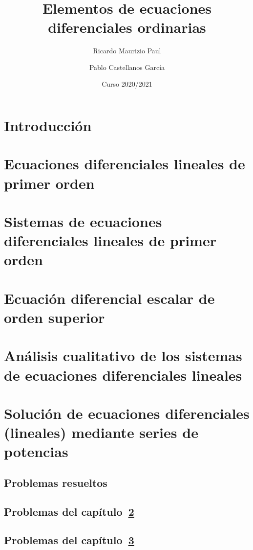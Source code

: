 \documentclass{report}
\title{Elementos de ecuaciones diferenciales ordinarias}
\author{Ricardo Maurizio Paul \and Pablo Castellanos García}
\date{Curso 2020/2021}
\begin{document}
\maketitle
\tableofcontents

\setcounter{chapter}{-1}
\chapter{Introducción}


\chapter{Ecuaciones diferenciales lineales de primer orden}
\label{chap:capitulo1}


\chapter{Sistemas de ecuaciones diferenciales lineales de primer orden}
\label{chap:capitulo2}



\chapter{Ecuación diferencial escalar de orden superior}
\label{chap:capitulo3}


\chapter{Análisis cualitativo de los sistemas de ecuaciones diferenciales lineales}
\label{chap:capitulo4}


\chapter{Solución de ecuaciones diferenciales (lineales) mediante series de potencias}
\label{chap:capitulo5}


\begin{appendices}

\chapter{Problemas resueltos}

\section{Problemas del capítulo~\ref{chap:capitulo1}}


\section{Problemas del capítulo~\ref{chap:capitulo2}}


\end{appendices}
\end{document}
